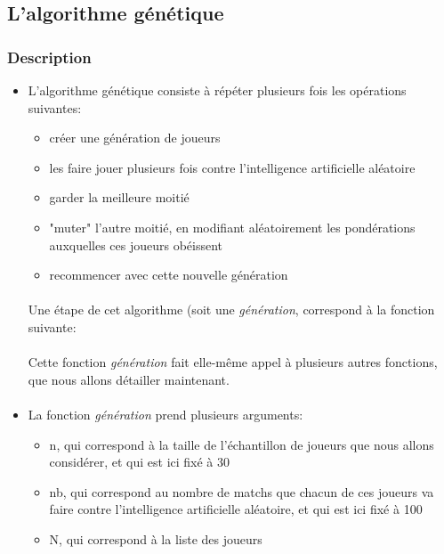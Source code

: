 \documentclass[10pt, french]{article}
\begin{document}
\paragraph{}



\paragraph{}
\subsection{L'algorithme génétique}
\subsubsection*{Description}
\begin{itemize}
    \item L'algorithme génétique consiste à répéter plusieurs fois les opérations suivantes: 
    \begin{itemize}
        \item créer une génération de joueurs
        \item les faire jouer plusieurs fois contre l'intelligence artificielle aléatoire  
        \item garder la meilleure moitié
        \item "muter" l'autre moitié, en modifiant aléatoirement les pondérations auxquelles ces joueurs obéissent 
        \item recommencer avec cette nouvelle génération
    \end{itemize}
    \paragraph{}
    Une étape de cet algorithme (soit une \textit{génération}, correspond à la fonction suivante: 
    
    \paragraph{}
Cette fonction \textit{génération} fait elle-même appel à plusieurs autres fonctions, que nous allons détailler maintenant. 

\paragraph{}
\item La fonction \textit{génération} prend plusieurs arguments: 
\begin{itemize}
    \item n, qui correspond à la taille de l'échantillon de joueurs que nous allons considérer, et qui est ici fixé à 30
    \item nb, qui correspond au nombre de matchs que chacun de ces joueurs va faire contre l'intelligence artificielle aléatoire, et qui est ici fixé à 100
    \item N, qui correspond à la liste des joueurs 
\end{itemize}


\end{itemize}
\end{document}
